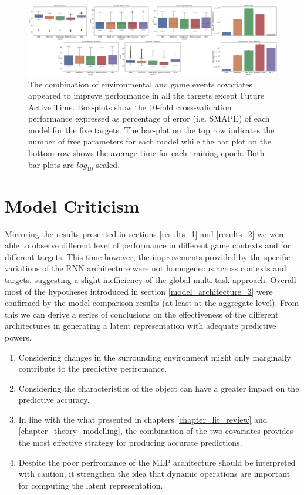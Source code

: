\begin{figure}[h]
\centering
\includegraphics[width=\textwidth]{images/chapter_3/performance_exploded_33.png}
\caption[\textbf{Dis-aggregated comparison of models' performance}]{The combination of environmental and game events covariates appeared to improve performance in all the targets except Future Active Time. Box-plots show the 10-fold cross-validation performance expressed as percentage of error (i.e. SMAPE) of each model for the five targets. The bar-plot on the top row indicates the number of free parameters for each model while the bar plot on the bottom row shows the average time for each training epoch. Both bar-plots are $log_{10}$ scaled.}
\label{model_comp_expl_33} 
\end{figure}

\section{Model Criticism}
\label{model_criticism_3}
Mirroring the results presented in sections \ref{results_1} and \ref{results_2} we were able to observe different level of performance in different game contexts and for different targets. This time however, the improvements provided by the specific variations of the RNN architecture were not homogeneous across contexts and targets, suggesting a slight inefficiency of the global multi-task approach. Overall most of the hypotheses introduced in section \ref{model_architecture_3} were confirmed by the model comparison results (at least at the aggregate level). From this we can derive a series of conclusions on the effectiveness of the different architectures in generating a latent representation with adequate predictive powers.

\begin{enumerate}
    \item Considering changes in the surrounding environment might only marginally contribute to the predictive perfromance.
    \item Considering the characteristics of the object can have a greater impact on the predictive accuracy.
    \item In line with the what presented in chapters \ref{chapter_lit_review} and \ref{chapter_theory_modelling}, the combination of the two covariates provides the most effective strategy for producing accurate predictions.
    \item Despite the poor perfromance of the MLP architecture should be interpreted with caution, it strengthen the idea that dynamic operations are important for computing the latent representation.
\end{enumerate}

